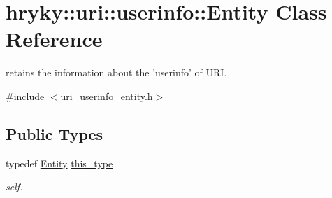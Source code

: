 \hypertarget{classhryky_1_1uri_1_1userinfo_1_1_entity}{\section{hryky\-:\-:uri\-:\-:userinfo\-:\-:Entity Class Reference}
\label{classhryky_1_1uri_1_1userinfo_1_1_entity}
}


retains the information about the 'userinfo' of U\-R\-I.  




{\ttfamily \#include $<$uri\-\_\-userinfo\-\_\-entity.\-h$>$}

\subsection*{Public Types}
\begin{DoxyCompactItemize}
\item 
\hypertarget{classhryky_1_1uri_1_1userinfo_1_1_entity_ac4680728d50e274ba5073c9d25c42c06}{typedef \hyperlink{classhryky_1_1uri_1_1userinfo_1_1_entity}{Entity} \hyperlink{classhryky_1_1uri_1_1userinfo_1_1_entity_ac4680728d50e274ba5073c9d25c42c06}{this\-\_\-type}}\label{classhryky_1_1uri_1_1userinfo_1_1_entity_ac4680728d50e274ba5073c9d25c42c06}

\begin{DoxyCompactList}\small\item\em self. \end{DoxyCompactList}\end{DoxyCompactItemize}
